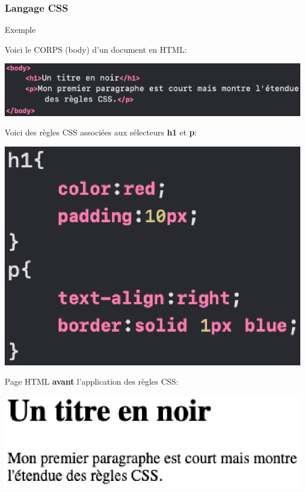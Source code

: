 \documentclass[8pt]{beamer}
\begin{document}
\begin{frame}
\frametitle{Langage CSS}

\begin{exampleblock}{Exemple}
\begin{minipage}{0.54\textwidth}
Voici le CORPS (body) d'un document en HTML:

\begin{center}
\includegraphics[scale=0.34]{img/exemple1-HTML.eps}
\end{center}

Voici des règles CSS associées aux sélecteurs \textbf{h1} et \textbf{p}:
\begin{center}
\includegraphics[scale=0.38]{img/exemple1-CSS.eps}
\end{center}
\end{minipage}\hfill
\begin{minipage}{0.42\textwidth}
Page HTML \textbf{avant} l'application des règles CSS:\medskip

\includegraphics[scale=0.4]{img/exempleCSS1.eps}


\end{minipage}
\end{exampleblock}
\end{frame}
\end{document}
